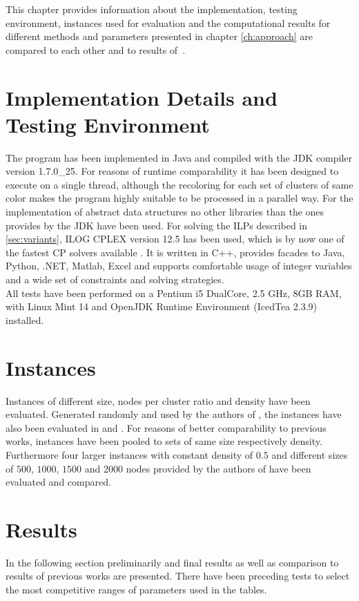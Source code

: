 This chapter provides information about the implementation, testing environment, instances used for evaluation and the computational results for different methods and parameters presented in chapter \ref{ch:approach} are compared to each other and to results of~\cite{li-00, noronha-06, frota-07}. 
\section{Implementation Details and Testing Environment}
The program has been implemented in Java and compiled with the JDK compiler version 1.7.0\_25. For reasons of runtime comparability it has been designed to execute on a single thread, although the recoloring for each set of clusters of same color makes the program highly suitable to be processed in a parallel way. For the implementation of abstract data structures no other libraries than the ones provides by the JDK have been used. For solving the ILPs described in \ref{sec:variants}, ILOG CPLEX version 12.5 has been used, which is by now one of the fastest CP solvers available \cite{Meindl-12}. It is written in C++, provides facades to Java, Python, .NET, Matlab, Excel and supports comfortable usage of integer variables and a wide set of constraints and solving strategies.\\
All tests have been performed on a Pentium i5 DualCore, 2.5 GHz, 8GB RAM, with Linux Mint 14 and OpenJDK Runtime Environment (IcedTea 2.3.9) installed.
\section{Instances}
Instances of different size, nodes per cluster ratio and density have been evaluated. Generated randomly and used by the authors of \cite{frota-07}, the instances have also been evaluated in \cite{pop-13} and \cite{volko-13}. For reasons of better comparability to previous works, instances have been pooled to sets of same size respectively density.
Furthermore four larger instances with constant density of $0.5$ and different sizes of $500$, $1000$, $1500$ and $2000$ nodes provided by the authors of \cite{noronha-06} have been evaluated and compared.

\section{Results}
In the following section preliminarily and final results as well as comparison to results of previous works are presented. There have been preceding tests to select the most competitive ranges of parameters used in the tables.
